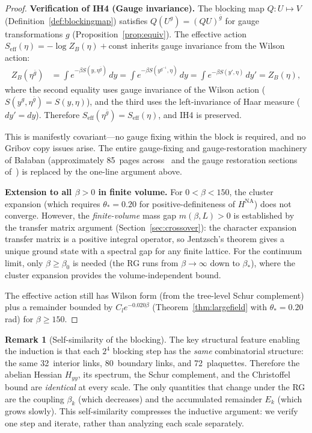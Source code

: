 \documentclass[11pt]{article}
\theoremstyle{definition}
\newtheorem{remark}[theorem]{Remark}
\begin{document}
\begin{proof}
\medskip\noindent\textbf{Verification of IH4 (Gauge invariance).}
The blocking map $Q:U\mapsto V$ (Definition~\ref{def:blockingmap})
satisfies $Q(U^g)=(QU)^{\bar g}$ for gauge transformations $g$
(Proposition~\ref{prop:equiv}).  The effective action
$S_{\mathrm{eff}}(\eta)=-\log Z_B(\eta)+\mathrm{const}$ inherits
gauge invariance from the Wilson action:
\begin{align}
Z_B(\eta^{\bar g})
&=\int e^{-\beta S(y,\eta^{\bar g})}\,dy
=\int e^{-\beta S(y^{g^{-1}},\eta)}\,dy
=\int e^{-\beta S(y',\eta)}\,dy'
=Z_B(\eta),
\end{align}
where the second equality uses gauge invariance of the Wilson action
($S(y^g,\eta^{\bar g})=S(y,\eta)$), and the third uses the
left-invariance of Haar measure ($dy'=dy$).  Therefore
$S_{\mathrm{eff}}(\eta^{\bar g})=S_{\mathrm{eff}}(\eta)$, and IH4
is preserved.

This is manifestly covariant---no gauge fixing within the block is
required, and no Gribov copy issues arise.  The entire gauge-fixing
and gauge-restoration machinery of Ba\l aban (approximately 85~pages
across~\cite{BalabanAvg,BalabanVar} and the gauge restoration
sections of~\cite{BalabanI,BalabanII}) is replaced by the one-line
argument above.

\medskip\noindent\textbf{Extension to all $\beta>0$ in finite volume.}
For $0<\beta<150$, the cluster expansion (which requires $\theta_*=0.20$
for positive-definiteness of $H^{\mathrm{NA}}$) does not converge.
However, the \emph{finite-volume} mass gap $m(\beta,L)>0$ is
established by the transfer matrix argument
(Section~\ref{sec:crossover}): the character expansion transfer
matrix is a positive integral operator, so Jentzsch's theorem
gives a unique ground state with a spectral gap for any finite
lattice.  For the continuum limit, only $\beta\ge\beta_0$
is needed (the RG runs from $\beta\to\infty$ down to $\beta_*$),
where the cluster expansion provides the volume-independent bound.

The effective action still has Wilson form (from the tree-level Schur
complement) plus a remainder bounded by $C_l e^{-0.020\beta}$
(Theorem~\ref{thm:largefield} with $\theta_*=0.20$\,rad) for
$\beta\ge 150$.
\end{proof}

\begin{remark}[Self-similarity of the blocking]\label{rem:selfsim}
The key structural feature enabling the induction is that each $2^4$
blocking step has the \emph{same} combinatorial structure: the same
32~interior links, 80~boundary links, and 72~plaquettes.  Therefore
the abelian Hessian $H_{yy}$, its spectrum, the Schur complement,
and the Christoffel bound are \emph{identical} at every
scale.  The only quantities that change under the RG are the coupling
$\beta_k$ (which decreases) and the accumulated remainder $E_k$
(which grows slowly).  This self-similarity compresses the inductive
argument: we verify one step and iterate, rather than analyzing each
scale separately.
\end{remark}
\end{document}
